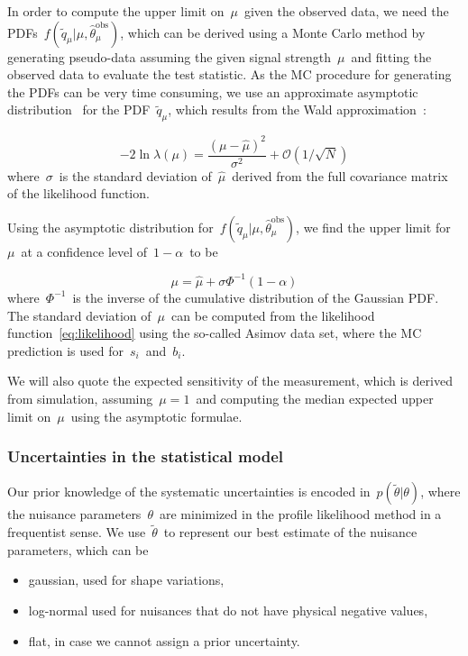 In order to compute the upper limit on~$\mu$~given the observed data, we need the PDFs~$f(\tilde{q}_\mu | \mu, \hat{\theta}_\mu^{\mathrm{obs}})$, which can be derived using a Monte Carlo method by generating pseudo-data assuming the given signal strength~$\mu$~and fitting the observed data to evaluate the test statistic. As the MC procedure for generating the PDFs can be very time consuming, we use an approximate asymptotic distribution~\cite{Cowan:2010js} for the PDF~$\tilde{q}_\mu$, which results from the Wald approximation~\cite{wald1943tests}:

\begin{equation}
-2 \ln{\lambda(\mu)} = \frac{(\mu - \hat{\mu})^2}{\sigma^2}+ \mathcal{O}(1/\sqrt{N})
\end{equation}
where~$\sigma$~is the standard deviation of~$\hat{\mu}$~derived from the full covariance matrix of the likelihood function.

Using the asymptotic distribution for~$f(\tilde{q}_\mu | \mu, \hat{\theta}_\mu^{\mathrm{obs}})$, we find the upper limit for~$\mu$~at a confidence level of~$1 - \alpha$~to be

\begin{equation}
\mu = \hat{\mu} + \sigma \Phi^{-1}(1 - \alpha)
\end{equation}
where~$\Phi^{-1}$~is the inverse of the cumulative distribution of the Gaussian PDF. The standard deviation of~$\mu$~can be computed from the likelihood function~\cref{eq:likelihood} using the so-called Asimov data set, where the MC prediction is used for~$s_i$~and~$b_i$.

We will also quote the expected sensitivity of the measurement, which is derived from simulation, assuming~$\mu = 1$~and computing the median expected upper limit on~$\mu$~using the asymptotic formulae. 

\subsubsection{Uncertainties in the statistical model}

Our prior knowledge of the systematic uncertainties is encoded in~$p(\tilde{\theta} | \theta)$, where the nuisance parameters~$\theta$~are minimized in the profile likelihood method in a frequentist sense. We use~$\tilde{\theta}$~to represent our best estimate of the nuisance parameters, which can be
\begin{itemize}
\item gaussian, used for shape variations,
\item log-normal used for nuisances that do not have physical negative values,
\item flat, in case we cannot assign a prior uncertainty.
\end{itemize}

